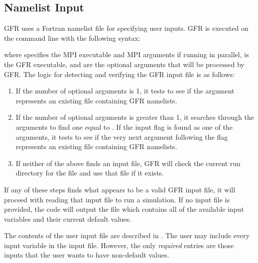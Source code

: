 \subsection{Namelist Input}
\label{SEC:Files:Namelist_Input}

GFR uses a Fortran namelist file for specifying user inputs.
%
GFR is executed on the command line with the following syntax:
%
\begin{InputExample}
  \item[{\inptext{[MPI commands] gfr [optional args]}}]
\end{InputExample}
%
where  specifies the MPI executable and MPI arguments if
running in parallel,  is the GFR executable, and 
 are the optional arguments that will be processed by
GFR.
%
The logic for detecting and verifying the GFR input file is as follows:
%
\begin{enumerate}
  \item
    If the number of optional arguments is 1, it tests to see if the argument
    represents an existing file containing GFR namelists.
  \item
    If the number of optional arguments is greater than 1, it searches through
    the arguments to find one equal to .
    If the input flag  is found as one of the arguments,
    it tests to see if the very next argument following the flag represents an
    existing file containing GFR namelists.
  \item
    If neither of the above finds an input file, GFR will check the current run
    directory for the file  and use that file if it exists.
\end{enumerate}
%
If any of these steps finds what appears to be a valid GFR input file, it will
proceed with reading that input file to run a simulation.
%
If no input file is provided, the code will output the file
 which contains all of the available input
variables and their current default values.
 

The contents of the user input file are described in
.
%
The user may include every input variable in the input file.
%
However, the only \emph{required} entries are those inputs that
the user wants to have non-default values.


